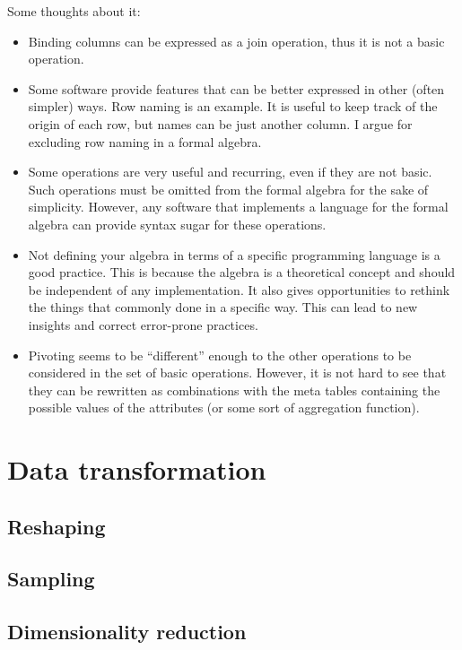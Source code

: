 Some thoughts about it:
\begin{itemize}
  \item Binding columns can be expressed as a join operation, thus it is not a basic
    operation.
  \item Some software provide features that can be better expressed in other (often simpler) ways.  Row
    naming is an example.  It is useful to keep track of the origin of each row, but names
    can be just another column.  I argue for excluding row naming in a formal algebra.
  \item Some operations are very useful and recurring, even if they are not basic.  Such
    operations must be omitted from the formal algebra for the sake of simplicity.
    However, any software that implements a language for the formal algebra can provide
    syntax sugar for these operations.
  \item Not defining your algebra in terms of a specific programming language is a good
    practice.  This is because the algebra is a theoretical concept and should be
    independent of any implementation.  It also gives opportunities to rethink the
    things that commonly done in a specific way.  This can lead to new insights and
    correct error-prone practices.
  \item Pivoting seems to be ``different'' enough to the other operations to be considered
    in the set of basic operations.  However, it is not hard to see that they can be
    rewritten as combinations with the meta tables containing the possible values of the
    attributes (or some sort of aggregation function).
\end{itemize}

\section{Data transformation}

\subsection{Reshaping}

\subsection{Sampling}

\subsection{Dimensionality reduction}

